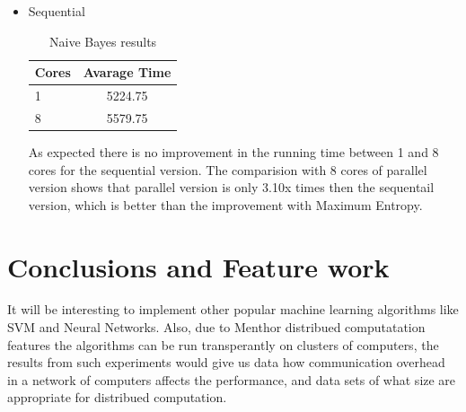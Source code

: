 \documentclass{report}
\begin{document}
\begin{itemize}
\item Sequential

\begin{table}[!htb]
\centering
\begin{tabular}{ l c }
    \hline\hline
    Cores & Avarage Time \\ [0.2ex]
    \hline
    1 & 5224.75 \\
    8 & 5579.75  \\
    \hline
  \end{tabular}
\label{table:naivebayes2}
\caption{Naive Bayes results}
\end{table}

As expected there is no improvement in the running time between 1 and 8 cores for the sequential version.  The comparision with 8 cores of parallel version shows that parallel version is only 3.10x times then the sequentail version, which is better than the improvement with Maximum Entropy.

\end{itemize}

\chapter{Conclusions and Feature work}

It will be interesting to implement other popular machine learning algorithms like SVM and Neural Networks. Also, due to Menthor distribued computatation features the algorithms can be run transperantly on clusters of computers, the results from  such experiments would give us data how communication overhead in a network of computers affects the performance, and data sets of what size are appropriate for distribued computation.

{}

\end{document}
